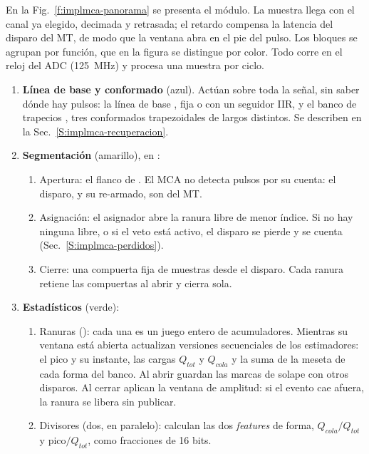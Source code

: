 En la Fig.~\ref{f:implmca-panorama} se presenta el módulo. La muestra llega con
el canal ya elegido, decimada y retrasada; el retardo compensa la latencia del
disparo del MT, de modo que la ventana abra en el pie del pulso. Los bloques se
agrupan por función, que en la figura se distingue por color. Todo corre en el
reloj del ADC (\qty{125}{\mega\hertz}) y procesa una muestra por ciclo.
\begin{enumerate}
  \item \textbf{Línea de base y conformado} (azul). Actúan sobre toda la señal,
    sin saber dónde hay pulsos: la línea de base , fija o
    con un seguidor IIR, y el banco de trapecios , tres
    conformados trapezoidales de largos distintos. Se describen en la
    Sec.~\ref{S:implmca-recuperacion}.
  \item \textbf{Segmentación} (amarillo), en :
  \begin{enumerate}
    \item Apertura: el flanco de . El MCA no detecta pulsos por
      su cuenta: el disparo, y su re-armado, son del MT.
    \item Asignación: el asignador abre la ranura libre de menor índice. Si no
      hay ninguna libre, o si el veto está activo, el disparo se pierde y se
      cuenta (Sec.~\ref{S:implmca-perdidos}).
    \item Cierre: una compuerta fija de  muestras desde el
      disparo. Cada ranura retiene las compuertas al abrir y cierra sola.
  \end{enumerate}
  \item \textbf{Estadísticos} (verde):
  \begin{enumerate}
    \item Ranuras  (): cada una es un juego
      entero de acumuladores. Mientras su ventana está abierta actualizan
      versiones secuenciales de los estimadores: el pico y su instante, las
      cargas $Q_{tot}$ y $Q_{cola}$ y la suma de la meseta de cada forma del
      banco. Al abrir guardan las marcas de solape con otros disparos. Al cerrar
      aplican la ventana de amplitud: si el evento cae afuera, la ranura se
      libera sin publicar.
    \item Divisores  (dos, en paralelo): calculan las
      dos \emph{features} de forma, $Q_{cola}/Q_{tot}$ y $\text{pico}/Q_{tot}$, como
      fracciones de 16 bits.
  \end{enumerate}

\end{enumerate}
